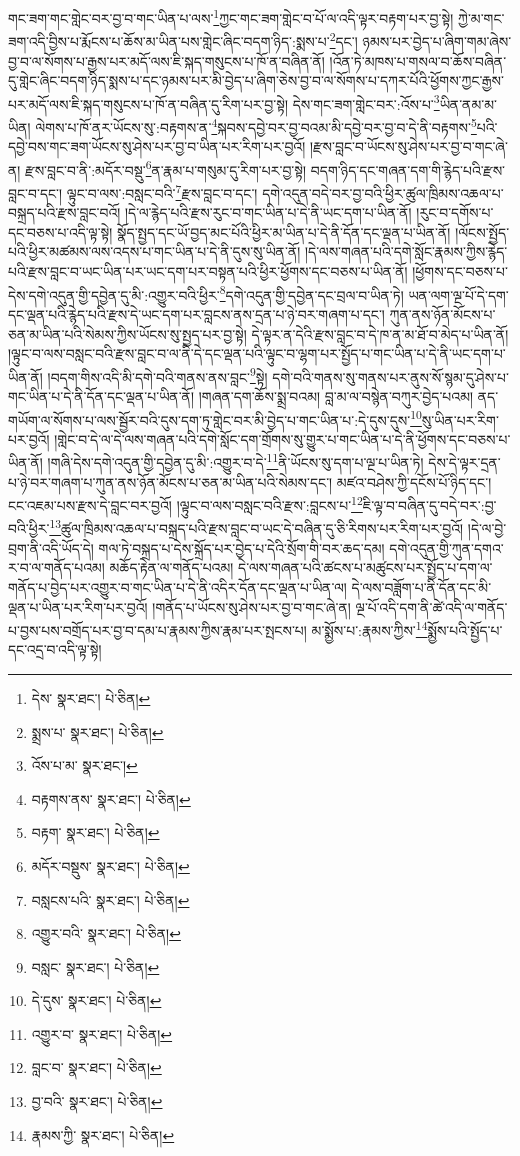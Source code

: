 གང་ཟག་གང་གླེང་བར་བྱ་བ་གང་ཡིན་པ་ལས་\footnote{དེས་  སྣར་ཐང་།  པེ་ཅིན། }ཀྱང་གང་ཟག་གླེང་བ་པོ་ལ་འདི་ལྟར་བརྟག་པར་བྱ་སྟེ། ཀྱེ་མ་གང་ཟག་འདི་བྱིས་པ་རྨོངས་པ་ཆོས་མ་ཡིན་པས་གླེང་ཞིང་བདག་ཉིད་:སྨས་པ་\footnote{སྨྲས་པ་  སྣར་ཐང་།  པེ་ཅིན། }དང་། ཉམས་པར་བྱེད་པ་ཞིག་གམ་ཞེས་བྱ་བ་ལ་སོགས་པ་རྒྱས་པར་མདོ་ལས་ཇི་སྐད་གསུངས་པ་ཁོ་ན་བཞིན་ནོ། །འོན་ཏེ་མཁས་པ་གསལ་བ་ཆོས་བཞིན་དུ་གླེང་ཞིང་བདག་ཉིད་སྨས་པ་དང་ཉམས་པར་མི་བྱེད་པ་ཞིག་ཅེས་བྱ་བ་ལ་སོགས་པ་དཀར་པོའི་ཕྱོགས་ཀྱང་རྒྱས་པར་མདོ་ལས་ཇི་སྐད་གསུངས་པ་ཁོ་ན་བཞིན་དུ་རིག་པར་བྱ་སྟེ། དེས་གང་ཟག་གླེང་བར་:འོས་པ་\footnote{འོས་པ་མ་  སྣར་ཐང་། }ཡིན་ནམ་མ་ཡིན། ལེགས་པ་ཁོ་ནར་ཡོངས་སུ་:བརྟགས་ན་\footnote{བརྟགས་ནས་  སྣར་ཐང་།  པེ་ཅིན། }སྐབས་དབྱེ་བར་བྱ་བའམ་མི་དབྱེ་བར་བྱ་བ་དེ་ནི་བརྟགས་\footnote{བརྟག་  སྣར་ཐང་།  པེ་ཅིན། }པའི་དབྱེ་བས་གང་ཟག་ཡོངས་སུ་ཤེས་པར་བྱ་བ་ཡིན་པར་རིག་པར་བྱའོ། །རྫས་བླང་བ་ཡོངས་སུ་ཤེས་པར་བྱ་བ་གང་ཞེ་ན། རྫས་བླང་བ་ནི་:མདོར་བསྡུ་\footnote{མདོར་བསྡུས་  སྣར་ཐང་།  པེ་ཅིན། }ན་རྣམ་པ་གསུམ་དུ་རིག་པར་བྱ་སྟེ། བདག་ཉིད་དང་གཞན་དག་གི་རྙེད་པའི་རྫས་བླང་བ་དང་། ལྟུང་བ་ལས་:བསླང་བའི་\footnote{བསླངས་པའི་  སྣར་ཐང་།  པེ་ཅིན། }རྫས་བླང་བ་དང་། དགེ་འདུན་བདེ་བར་བྱ་བའི་ཕྱིར་ཚུལ་ཁྲིམས་འཆལ་པ་བསྐྲད་པའི་རྫས་བླང་བའོ། །དེ་ལ་རྙེད་པའི་རྫས་རུང་བ་གང་ཡིན་པ་དེ་ནི་ཡང་དག་པ་ཡིན་ནོ། །རུང་བ་དགོས་པ་དང་བཅས་པ་འདི་ལྟ་སྟེ། སྣོད་སྤྱད་དང་ཡོ་བྱད་མང་པོའི་ཕྱིར་མ་ཡིན་པ་དེ་ནི་དོན་དང་ལྡན་པ་ཡིན་ནོ། །ལོངས་སྤྱོད་པའི་ཕྱིར་མཚམས་ལས་འདས་པ་གང་ཡིན་པ་དེ་ནི་དུས་སུ་ཡིན་ནོ། །དེ་ལས་གཞན་པའི་དགེ་སློང་རྣམས་ཀྱིས་རྙེད་པའི་རྫས་བླང་བ་ཡང་ཡིན་པར་ཡང་དག་པར་བསྟན་པའི་ཕྱིར་ཕྱོགས་དང་བཅས་པ་ཡིན་ནོ། །ཕྱོགས་དང་བཅས་པ་དེས་དགེ་འདུན་གྱི་དབྱེན་དུ་མི་:འགྱུར་བའི་ཕྱིར་\footnote{འགྱུར་བའི་  སྣར་ཐང་།  པེ་ཅིན། }དགེ་འདུན་གྱི་དབྱེན་དང་བྲལ་བ་ཡིན་ཏེ། ཡན་ལག་ལྔ་པོ་དེ་དག་དང་ལྡན་པའི་རྙེད་པའི་རྫས་དེ་ཡང་དག་པར་བླངས་ནས་དྲན་པ་ཉེ་བར་གཞག་པ་དང་། ཀུན་ནས་ཉོན་མོངས་པ་ཅན་མ་ཡིན་པའི་སེམས་ཀྱིས་ཡོངས་སུ་སྤྱད་པར་བྱ་སྟེ། དེ་ལྟར་ན་དེའི་རྫས་བླང་བ་དེ་ཁ་ན་མ་ཐོ་བ་མེད་པ་ཡིན་ནོ། །ལྟུང་བ་ལས་བསླང་བའི་རྫས་བླང་བ་ལ་ནི་དེ་དང་ལྡན་པའི་ལྟུང་བ་ལྷག་པར་སྤྱོད་པ་གང་ཡིན་པ་དེ་ནི་ཡང་དག་པ་ཡིན་ནོ། །བདག་གིས་འདི་མི་དགེ་བའི་གནས་ནས་བླང་\footnote{བསླང་  སྣར་ཐང་།  པེ་ཅིན། }སྟེ། དགེ་བའི་གནས་སུ་གནས་པར་ནུས་སོ་སྙམ་དུ་ཤེས་པ་གང་ཡིན་པ་དེ་ནི་དོན་དང་ལྡན་པ་ཡིན་ནོ། །གཞན་དག་ཆོས་སྨྲ་བའམ། བླ་མ་ལ་བསྙེན་བཀུར་བྱེད་པའམ། ནད་གཡོག་ལ་སོགས་པ་ལས་སྦྱོར་བའི་དུས་དག་ཏུ་གླེང་བར་མི་བྱེད་པ་གང་ཡིན་པ་:དེ་དུས་དུས་\footnote{དེ་དུས་  སྣར་ཐང་།  པེ་ཅིན། }སུ་ཡིན་པར་རིག་པར་བྱའོ། །གླེང་བ་དེ་ལ་དེ་ལས་གཞན་པའི་དགེ་སློང་དག་གྲོགས་སུ་གྱུར་པ་གང་ཡིན་པ་དེ་ནི་ཕྱོགས་དང་བཅས་པ་ཡིན་ནོ། །གཞི་དེས་དགེ་འདུན་གྱི་དབྱེན་དུ་མི་:འགྱུར་བ་དེ་\footnote{འགྱུར་བ་  སྣར་ཐང་།  པེ་ཅིན། }ནི་ཡོངས་སུ་དག་པ་ལྔ་པ་ཡིན་ཏེ། དེས་དེ་ལྟར་དྲན་པ་ཉེ་བར་གཞག་པ་ཀུན་ནས་ཉོན་མོངས་པ་ཅན་མ་ཡིན་པའི་སེམས་དང་། མཛའ་བཤེས་ཀྱི་དངོས་པོ་ཉིད་དང་། ངང་འཇམ་པས་རྫས་དེ་བླང་བར་བྱའོ། །ལྟུང་བ་ལས་བསླང་བའི་རྫས་:བླངས་པ་\footnote{བླང་བ་  སྣར་ཐང་།  པེ་ཅིན། }ཇི་ལྟ་བ་བཞིན་དུ་བདེ་བར་:བྱ་བའི་ཕྱིར་\footnote{བྱ་བའི་  སྣར་ཐང་།  པེ་ཅིན། }ཚུལ་ཁྲིམས་འཆལ་པ་བསྐྲད་པའི་རྫས་བླང་བ་ཡང་དེ་བཞིན་དུ་ཅི་རིགས་པར་རིག་པར་བྱའོ། །དེ་ལ་བྱེ་བྲག་ནི་འདི་ཡོད་དེ། གལ་ཏེ་བསྐྲད་པ་དེས་སྐྲོད་པར་བྱེད་པ་དེའི་སྲོག་གི་བར་ཆད་དམ། དགེ་འདུན་གྱི་ཀུན་དགའ་ར་བ་ལ་གནོད་པའམ། མཆོད་རྟེན་ལ་གནོད་པའམ། དེ་ལས་གཞན་པའི་ཚངས་པ་མཚུངས་པར་སྤྱོད་པ་དག་ལ་གནོད་པ་བྱེད་པར་འགྱུར་བ་གང་ཡིན་པ་དེ་ནི་འདིར་དོན་དང་ལྡན་པ་ཡིན་ལ། དེ་ལས་བཟློག་པ་ནི་དོན་དང་མི་ལྡན་པ་ཡིན་པར་རིག་པར་བྱའོ། །གནོད་པ་ཡོངས་སུ་ཤེས་པར་བྱ་བ་གང་ཞེ་ན། ལྔ་པོ་འདི་དག་ནི་ཚེ་འདི་ལ་གནོད་པ་བྱས་པས་བགྲོད་པར་བྱ་བ་དམ་པ་རྣམས་ཀྱིས་རྣམ་པར་སྤངས་པ། མ་སྨྱོས་པ་:རྣམས་ཀྱིས་\footnote{རྣམས་ཀྱི་  སྣར་ཐང་།  པེ་ཅིན། }སྨྱོས་པའི་སྤྱོད་པ་དང་འདྲ་བ་འདི་ལྟ་སྟེ། 